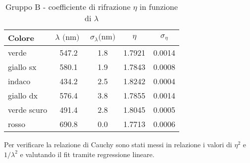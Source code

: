 \begin{table}[!htbp]
    {\par\centering
    \begin{tabular}{lcccc}
        \hline
            Colore & 
            $\lambda \text{ (nm) }$ &
            $\sigma_{\lambda} \text{(nm)}$ & 
            $\eta$ &
            $\sigma_{\eta}$ \\
        \hline
        verde        &   547.2  & 1.8 &  1.7921 &   0.0014 \\
        giallo sx    &   580.1  & 1.9 &  1.7843 &   0.0008 \\
        indaco       &   434.2  & 2.5 &  1.8242 &   0.0004 \\
        giallo dx    &   576.4  & 3.8 &  1.7855 &   0.0014 \\
        verde scuro  &   491.4  & 2.8 &  1.8045 &   0.0005 \\
        rosso        &   690.8  & 0.0 &  1.7713 &   0.0006 \\
        \hline
    \end{tabular}
    \par}
    \caption{Gruppo B - coefficiente di rifrazione $\eta$ in funzione di $\lambda$}
\end{table}

Per verificare la relazione di Cauchy sono stati messi in relazione i valori di $\eta^2$ e $1/\lambda^2$
e valutando il fit tramite regressione lineare.

